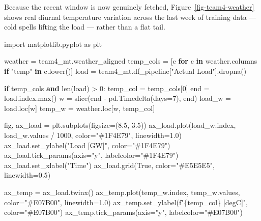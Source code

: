 \documentclass[
  english,
  letterpaper,
]{scrbook}
\newenvironment{Shaded}{\begin{snugshade}}{\end{snugshade}}
\newcommand{\BuiltInTok}[1]{\textcolor[rgb]{0.00,0.23,0.31}{#1}}
\newcommand{\ControlFlowTok}[1]{\textcolor[rgb]{0.00,0.23,0.31}{\textbf{#1}}}
\newcommand{\DecValTok}[1]{\textcolor[rgb]{0.68,0.00,0.00}{#1}}
\newcommand{\FloatTok}[1]{\textcolor[rgb]{0.68,0.00,0.00}{#1}}
\newcommand{\ImportTok}[1]{\textcolor[rgb]{0.00,0.46,0.62}{#1}}
\newcommand{\KeywordTok}[1]{\textcolor[rgb]{0.00,0.23,0.31}{\textbf{#1}}}
\newcommand{\NormalTok}[1]{\textcolor[rgb]{0.00,0.23,0.31}{#1}}
\newcommand{\OperatorTok}[1]{\textcolor[rgb]{0.37,0.37,0.37}{#1}}
\newcommand{\SpecialCharTok}[1]{\textcolor[rgb]{0.37,0.37,0.37}{#1}}
\newcommand{\SpecialStringTok}[1]{\textcolor[rgb]{0.13,0.47,0.30}{#1}}
\newcommand{\StringTok}[1]{\textcolor[rgb]{0.13,0.47,0.30}{#1}}
\newcommand{\VariableTok}[1]{\textcolor[rgb]{0.07,0.07,0.07}{#1}}
\begin{document}
Because the recent window is now genuinely fetched,
Figure~\ref{fig-team4-weather} shows real diurnal temperature variation
across the last week of training data --- cold spells lifting the load
--- rather than a flat tail.

\begin{Shaded}
\begin{Highlighting}[]
\ImportTok{import}\NormalTok{ matplotlib.pyplot }\ImportTok{as}\NormalTok{ plt}

\NormalTok{weather }\OperatorTok{=}\NormalTok{ team4\_mt.weather\_aligned}
\NormalTok{temp\_cols }\OperatorTok{=}\NormalTok{ [c }\ControlFlowTok{for}\NormalTok{ c }\KeywordTok{in}\NormalTok{ weather.columns }\ControlFlowTok{if} \StringTok{"temp"} \KeywordTok{in}\NormalTok{ c.lower()]}
\NormalTok{load }\OperatorTok{=}\NormalTok{ team4\_mt.df\_pipeline[}\StringTok{"Actual Load"}\NormalTok{].dropna()}

\ControlFlowTok{if}\NormalTok{ temp\_cols }\KeywordTok{and} \BuiltInTok{len}\NormalTok{(load) }\OperatorTok{\textgreater{}} \DecValTok{0}\NormalTok{:}
\NormalTok{    temp\_col }\OperatorTok{=}\NormalTok{ temp\_cols[}\DecValTok{0}\NormalTok{]}
\NormalTok{    end }\OperatorTok{=}\NormalTok{ load.index.}\BuiltInTok{max}\NormalTok{()}
\NormalTok{    w }\OperatorTok{=} \BuiltInTok{slice}\NormalTok{(end }\OperatorTok{{-}}\NormalTok{ pd.Timedelta(days}\OperatorTok{=}\DecValTok{7}\NormalTok{), end)}
\NormalTok{    load\_w }\OperatorTok{=}\NormalTok{ load.loc[w]}
\NormalTok{    temp\_w }\OperatorTok{=}\NormalTok{ weather.loc[w, temp\_col]}

\NormalTok{    fig, ax\_load }\OperatorTok{=}\NormalTok{ plt.subplots(figsize}\OperatorTok{=}\NormalTok{(}\FloatTok{8.5}\NormalTok{, }\FloatTok{3.5}\NormalTok{))}
\NormalTok{    ax\_load.plot(load\_w.index, load\_w.values }\OperatorTok{/} \DecValTok{1000}\NormalTok{, color}\OperatorTok{=}\StringTok{"\#1F4E79"}\NormalTok{, linewidth}\OperatorTok{=}\FloatTok{1.0}\NormalTok{)}
\NormalTok{    ax\_load.set\_ylabel(}\StringTok{"Load [GW]"}\NormalTok{, color}\OperatorTok{=}\StringTok{"\#1F4E79"}\NormalTok{)}
\NormalTok{    ax\_load.tick\_params(axis}\OperatorTok{=}\StringTok{"y"}\NormalTok{, labelcolor}\OperatorTok{=}\StringTok{"\#1F4E79"}\NormalTok{)}
\NormalTok{    ax\_load.set\_xlabel(}\StringTok{"Time"}\NormalTok{)}
\NormalTok{    ax\_load.grid(}\VariableTok{True}\NormalTok{, color}\OperatorTok{=}\StringTok{"\#E5E5E5"}\NormalTok{, linewidth}\OperatorTok{=}\FloatTok{0.5}\NormalTok{)}

\NormalTok{    ax\_temp }\OperatorTok{=}\NormalTok{ ax\_load.twinx()}
\NormalTok{    ax\_temp.plot(temp\_w.index, temp\_w.values, color}\OperatorTok{=}\StringTok{"\#E07B00"}\NormalTok{, linewidth}\OperatorTok{=}\FloatTok{1.0}\NormalTok{)}
\NormalTok{    ax\_temp.set\_ylabel(}\SpecialStringTok{f"}\SpecialCharTok{\{}\NormalTok{temp\_col}\SpecialCharTok{\}}\SpecialStringTok{ [degC]"}\NormalTok{, color}\OperatorTok{=}\StringTok{"\#E07B00"}\NormalTok{)}
\NormalTok{    ax\_temp.tick\_params(axis}\OperatorTok{=}\StringTok{"y"}\NormalTok{, labelcolor}\OperatorTok{=}\StringTok{"\#E07B00"}\NormalTok{)}


\end{Highlighting}
\end{Shaded}
\end{document}
